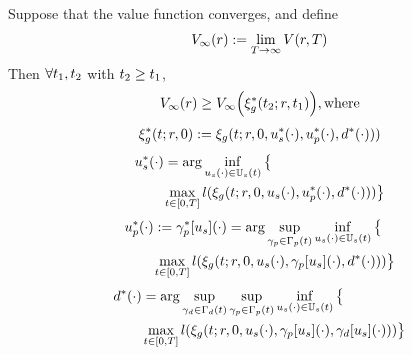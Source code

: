  \begin{prop}
   \label{prop:main}
   Suppose that the value function converges, and define
      \begin{equation}
      \label{eq:conv_valfunc}
      \valfunc_\infty(\rstate) := \lim_{\thor\rightarrow\infty}\valfunc(\rstate, T)
      \end{equation}
   Then $\forall t_1, t_2$ with $t_2 \ge t_1$,
   \begin{equation}
   \label{eq:invariant}
   \valfunc_\infty(\rstate) \ge \valfunc_\infty\Big(\rtraj^*(\tvar_2; \rstate, \tvar_1)\Big), \text{where}
   \end{equation}
   \begin{equation}
   \begin{aligned}
   \xi_g^*(t; r, 0) := \xi_g(t; r, 0, u_s^*(\cdot), u_p^*(\cdot), d^*(\cdot))) \\
   \end{aligned}
   \end{equation}
   \begin{equation}
   \begin{aligned}
   &u_s^*(\cdot) = \arg \inf_{u_s(\cdot)\in\mathbb{U}_s(t)}\big\{\\
   & \qquad \max_{t \in [0, T]} l(\xi_g(t; r, 0, u_s(\cdot), u_p^*(\cdot), d^*(\cdot))) \big\}\\
    \end{aligned}
   \end{equation}
   \begin{equation}
   \begin{aligned}
   & u_p^*(\cdot) := \gamma_p^*[u_s](\cdot) = \arg \sup_{\gamma_{p} \in \Gamma_p(t)} \inf_{u_s(\cdot) \in \mathbb{U}_s(t)} \big\{ \\
   & \qquad \max_{t \in [0, T]} l(\xi_g(t; r, 0, u_s(\cdot), \gamma_p[u_s](\cdot), d^*(\cdot))) \big\} \\
    \end{aligned}
   \end{equation}
   \begin{equation}
   \begin{aligned}
   & d^*(\cdot) = \arg \sup_{\gamma_{d} \in \Gamma_d(t)} \sup_{\gamma_{p} \in \Gamma_p(t)} \inf_{u_s(\cdot) \in \mathbb{U}_s(t)} \big\{\\
   & \qquad \max_{t \in [0, T]} l(\xi_g(t; r, 0, u_s(\cdot), \gamma_p[u_s](\cdot), \gamma_d[u_s](\cdot))) \big\}
   \end{aligned}
   \end{equation}
 \end{prop}

